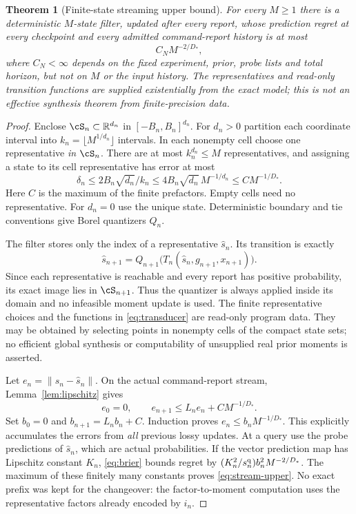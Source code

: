 \documentclass[11pt]{amsart}
\newtheorem{theorem}{Theorem}[section]
\theoremstyle{definition}\newtheorem{definition}[theorem]{Definition}
\theoremstyle{remark}\newtheorem{remark}[theorem]{Remark}
\newcommand{\R}{\mathbb R}\newcommand{\N}{\mathbb N}\newcommand{\C}{\mathbb C}
\newcommand{\norm}[1]{\left\lVert#1\right\rVert}
\begin{document}
\begin{theorem}[Finite-state streaming upper bound]\label{thm:stream-upper}
For every $M\ge1$ there is a deterministic $M$-state filter, updated after
every report, whose prediction regret at every checkpoint and every
admitted command-report history is at most
\begin{equation}\label{eq:stream-upper}
 C_N M^{-2/D_*},
\end{equation}
where $C_N<\infty$ depends on the fixed experiment, prior, probe lists
and total horizon, but not on $M$ or the input history. The representatives
and read-only transition functions are supplied existentially from the exact
model; this is not an effective synthesis theorem from finite-precision data.
\end{theorem}
\begin{proof}
Enclose $\cS_n\subset\R^{d_n}$ in $[-B_n,B_n]^{d_n}$. For $d_n>0$
partition each coordinate interval into
$k_n=\lfloor M^{1/d_n}\rfloor$ intervals. In each nonempty cell choose
one representative \emph{in} $\cS_n$. There are at most $k_n^{d_n}\le M$
representatives, and assigning a state to its cell representative has
error at most
\[
 \delta_n\le 2B_n\sqrt{d_n}/k_n
 \le4B_n\sqrt{d_n}\,M^{-1/d_n}
 \le C M^{-1/D_*}.
\]
Here $C$ is the maximum of the finite prefactors. Empty cells need no
representative. For $d_n=0$ use the unique state. Deterministic boundary
and tie conventions give Borel quantizers $Q_n$.

The filter stores only the index of a representative $\widehat s_n$.
Its transition is exactly
\begin{equation}\label{eq:transducer}
 \widehat s_{n+1}
   =Q_{n+1}\bigl(T_n(\widehat s_n,g_{n+1},x_{n+1})\bigr).
\end{equation}
Since each representative is reachable and every report has positive
probability, its exact image lies in $\cS_{n+1}$. Thus the quantizer is
always applied inside its domain and no infeasible moment update is used.
The finite representative choices and the functions in
\eqref{eq:transducer} are read-only program data. They may be obtained by
selecting points in nonempty cells of the compact state sets; no efficient global synthesis
or computability of unsupplied real prior moments is asserted.

Let $e_n=\norm{s_n-\widehat s_n}$. On the actual command-report stream,
Lemma~\ref{lem:lipschitz} gives
\[
 e_0=0,\qquad e_{n+1}\le L_ne_n+C M^{-1/D_*}.
\]
Set $b_0=0$ and $b_{n+1}=L_nb_n+C$. Induction proves
$e_n\le b_nM^{-1/D_*}$. This explicitly accumulates the errors from
\emph{all} previous lossy updates. At a query use the probe predictions
of $\widehat s_n$, which are actual probabilities. If the vector prediction
map has Lipschitz constant $K_n$, \eqref{eq:brier} bounds regret by
$(K_n^2/s_n^{\rm q})b_n^2 M^{-2/D_*}$. The maximum of these finitely
many constants proves \eqref{eq:stream-upper}. No exact prefix was kept
for the changeover: the factor-to-moment computation uses the representative
factors already encoded by $i_n$.
\end{proof}
\end{document}
